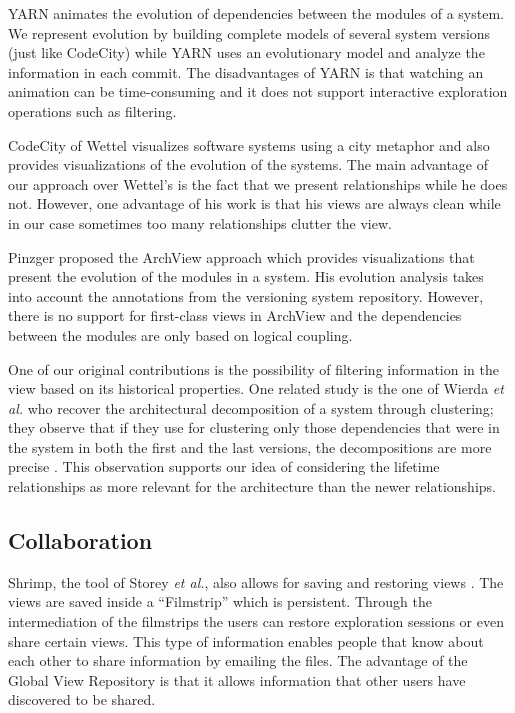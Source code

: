 \documentclass[preprint,12pt]{elsarticle}
\newcommand{\etal}{\emph{et al.}\xspace}
\begin{document}
YARN \cite{hindle-yarn} animates the evolution of dependencies between the modules of a system. We represent evolution by building complete models of several system versions (just like CodeCity) while YARN uses an evolutionary model and analyze the information in each commit. The disadvantages of YARN is that watching an animation can be time-consuming and it does not support interactive exploration operations such as filtering. 

CodeCity of Wettel \cite{wettel-icse11} visualizes software systems using a city metaphor and also provides visualizations of the evolution of the systems. The main advantage of our approach over  Wettel's is the fact that we present relationships while he does not. However, one advantage of his work is that his views are always clean while in our case sometimes too many relationships clutter the view.

Pinzger proposed the ArchView approach \cite{pinzger-thesis} which provides visualizations that present the evolution of the modules in a system. His evolution analysis takes into account the annotations from the versioning system repository. However, there is no support for first-class views in ArchView and the dependencies between the modules are only based on logical coupling. 

One of our original contributions is the possibility of filtering information in the view based on its historical properties. One related study is the one of Wierda \etal who recover the architectural decomposition of a system through clustering; they observe that if they use for clustering only those dependencies that were in the system in both the first and the last versions, the decompositions are more precise \cite{wierda-clustering}. This observation supports our idea of considering the lifetime relationships as more relevant for the architecture than the newer relationships. 

\subsection {Collaboration} 

Shrimp, the tool of Storey \etal, also allows for saving and restoring views \cite{rayside-flow}. The views are saved inside a ``Filmstrip'' which is persistent. Through the intermediation of the filmstrips the users can restore exploration sessions or even share certain views. This type of information enables people that know about each other to share information by emailing the files. The advantage of the Global View Repository is that it {allows information that other users have discovered to be shared}.
\end{document}
